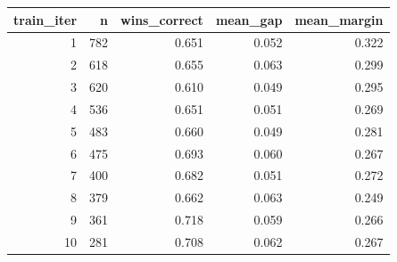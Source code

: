 \begin{tabular}{rrrrr}
\toprule
train\_iter & n & wins\_correct & mean\_gap & mean\_margin \\
\midrule
1 & 782 & 0.651 & 0.052 & 0.322 \\
2 & 618 & 0.655 & 0.063 & 0.299 \\
3 & 620 & 0.610 & 0.049 & 0.295 \\
4 & 536 & 0.651 & 0.051 & 0.269 \\
5 & 483 & 0.660 & 0.049 & 0.281 \\
6 & 475 & 0.693 & 0.060 & 0.267 \\
7 & 400 & 0.682 & 0.051 & 0.272 \\
8 & 379 & 0.662 & 0.063 & 0.249 \\
9 & 361 & 0.718 & 0.059 & 0.266 \\
10 & 281 & 0.708 & 0.062 & 0.267 \\
\bottomrule
\end{tabular}
